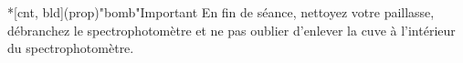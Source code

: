 \documentclass[../main/main.tex]{subfiles}
\begin{document}

\begin{tcb}*[cnt, bld](prop)"bomb"{Important}
	En fin de séance, nettoyez votre paillasse, débranchez le
	spectrophotomètre et ne pas oublier d'enlever la cuve à l'intérieur du
	spectrophotomètre.
\end{tcb}

% 
\end{document}
